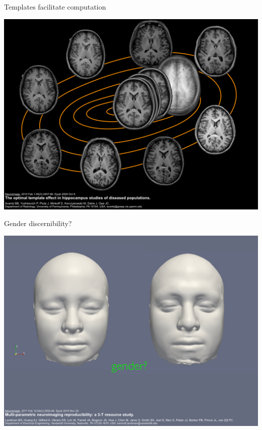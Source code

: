 \documentclass[ignorenonframetext,]{beamer}
\begin{document}
\begin{frame}{Templates facilitate computation}

\includegraphics{./Figs/template4.jpg}

\end{frame}

\begin{frame}{Gender discernibility?}

\includegraphics{./Figs/template5.jpg}

\end{frame}
\end{document}
